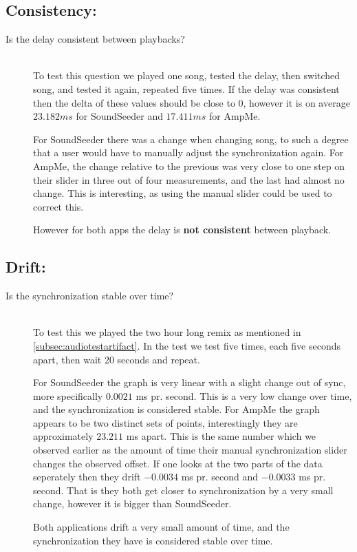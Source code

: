 \subsection*{Consistency:}
\begin{description}
    \item[Is the delay consistent between playbacks?] \hfill \\
    To test this question we played one song, tested the delay, then switched song, and tested it again, repeated five times.
    If the delay was consistent then the delta of these values should be close to $0$, however it is on average $23.182 ms$ for SoundSeeder and $17.411 ms$ for AmpMe.

    For SoundSeeder there was a change when changing song, to such a degree that a user would have to manually adjust the synchronization again.
    For AmpMe, the change relative to the previous was very close to one step on their slider in three out of four measurements, and the last had almost no change.
    This is interesting, as using the manual slider could be used to correct this.

    However for both apps the delay is \textbf{not consistent} between playback.
\end{description}

\subsection*{Drift:}
\begin{description}
    \item[Is the synchronization stable over time?] \hfill \\
    To test this we played the two hour long remix as mentioned in \vref{subsec:audiotestartifact}.
    In the test we test five times, each five seconds apart, then wait 20 seconds and repeat.

    For SoundSeeder the graph is very linear with a slight change out of sync, more specifically $0.0021$ ms pr. second.
    This is a very low change over time, and the synchronization is considered stable.
    For AmpMe the graph appears to be two distinct sets of points, interestingly they are approximately $23.211$ ms apart.
    This is the same number which we observed earlier as the amount of time their manual synchronization slider changes the observed offset.
    If one looks at the two parts of the data seperately then they drift $-0.0034$ ms pr. second and $-0.0033$ ms pr. second.
    That is they both get closer to synchronization by a very small change, however it is bigger than SoundSeeder.

    Both applications drift a very small amount of time, and the synchronization they have is considered stable over time.
\end{description}

